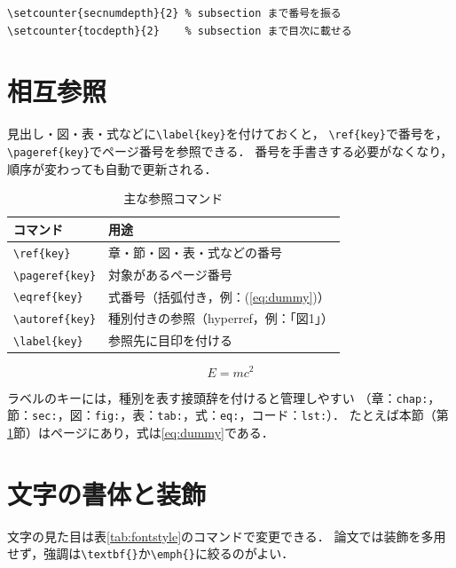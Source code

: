 \begin{lstlisting}[language={[LaTeX]TeX}, numbers=none, frame=single]
\setcounter{secnumdepth}{2} % subsection まで番号を振る
\setcounter{tocdepth}{2}    % subsection まで目次に載せる
\end{lstlisting}

\section{相互参照}
\label{sec:crossref}
見出し・図・表・式などに\verb|\label{key}|を付けておくと，
\verb|\ref{key}|で番号を，\verb|\pageref{key}|でページ番号を参照できる．
番号を手書きする必要がなくなり，順序が変わっても自動で更新される．

\begin{table}[htbp]
    \centering
    \caption{主な参照コマンド}
    \label{tab:refcmd}
    \begin{tabular}{ll}\toprule
        コマンド & 用途 \\ \midrule
        \verb|\ref{key}|     & 章・節・図・表・式などの番号 \\
        \verb|\pageref{key}| & 対象があるページ番号 \\
        \verb|\eqref{key}|   & 式番号（括弧付き，例：(\ref{eq:dummy})） \\
        \verb|\autoref{key}| & 種別付きの参照（hyperref，例：「図1」） \\
        \verb|\label{key}|   & 参照先に目印を付ける \\ \bottomrule
    \end{tabular}
\end{table}

\begin{equation}\label{eq:dummy} E = mc^2 \end{equation}

ラベルのキーには，種別を表す接頭辞を付けると管理しやすい
（章：\verb|chap:|，節：\verb|sec:|，図：\verb|fig:|，表：\verb|tab:|，式：\verb|eq:|，コード：\verb|lst:|）．
たとえば本節（第\ref{sec:crossref}節）は\pageref{sec:crossref}ページにあり，式は\eqref{eq:dummy}である．

\section{文字の書体と装飾}
\label{sec:fontstyle}
文字の見た目は表\ref{tab:fontstyle}のコマンドで変更できる．
論文では装飾を多用せず，強調は\verb|\textbf{}|か\verb|\emph{}|に絞るのがよい．

